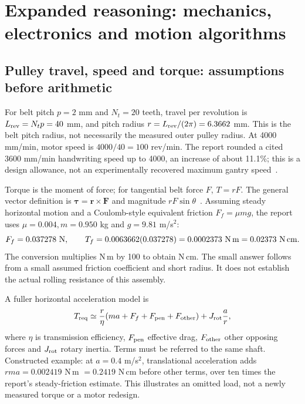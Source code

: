 \section{Expanded reasoning: mechanics, electronics and motion algorithms}
\label{sec:expand-hardware}
\subsection{Pulley travel, speed and torque: assumptions before arithmetic}
For belt pitch $p=2$ mm and $N_t=20$ teeth, travel per revolution is
$L_{\rm rev}=N_tp=40$ mm, and pitch radius
$r=L_{\rm rev}/(2\pi)=6.3662$ mm. This is the belt pitch radius, not
necessarily the measured outer pulley radius. At 4000 mm/min, motor speed
is $4000/40=100$ rev/min. The report rounded a cited 3600 mm/min handwriting
speed up to 4000, an increase of about 11.1\%; this is a design allowance,
not an experimentally recovered maximum gantry speed~\cite{finalreport2026}.

Torque is the moment of force; for tangential belt force $F$, $T=rF$.
The general vector definition is $\boldsymbol\tau=\mathbf r\times\mathbf F$
and magnitude $rF\sin\theta$~\cite{openstaxrotation}. Assuming steady
horizontal motion and a Coulomb-style equivalent friction $F_f=\mu mg$,
the report uses $\mu=0.004,m=0.950$ kg and $g=9.81$ m/s$^2$:
\[
F_f=0.037278\ {\rm N},\qquad
T_f=0.0063662(0.037278)=0.0002373\ {\rm N\,m}
       =0.02373\ {\rm N\,cm}.
\]
The conversion multiplies N\,m by 100 to obtain N\,cm. The small answer
follows from a small assumed friction coefficient and short radius. It does
not establish the actual rolling resistance of this assembly.

A fuller horizontal acceleration model is
\[
T_{\rm req}\simeq {r\over\eta}(ma+F_f+F_{\rm pen}+F_{\rm other})
              +J_{\rm rot}{a\over r},
\]
where $\eta$ is transmission efficiency, $F_{\rm pen}$ effective drag,
$F_{\rm other}$ other opposing forces and $J_{\rm rot}$ rotary inertia.
Terms must be referred to the same shaft. Constructed example: at
$a=0.4$ m/s$^2$, translational acceleration adds
$rma=0.002419$ N\,m $=0.2419$ N\,cm before other terms, over ten times
the report's steady-friction estimate. This illustrates an omitted load,
not a newly measured torque or a motor redesign.

